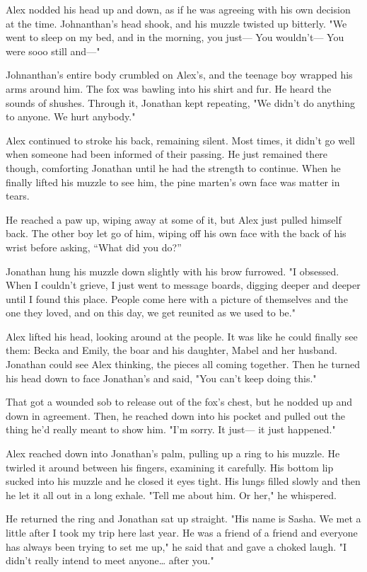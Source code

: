 Alex nodded his head up and down, as if he was agreeing with his own
decision at the time. Johnanthan's head shook, and his muzzle twisted up
bitterly. "We went to sleep on my bed, and in the morning, you just---
You wouldn't--- You were sooo still and---"

Johnanthan's entire body crumbled on Alex's, and the teenage boy wrapped
his arms around him. The fox was bawling into his shirt and fur. He
heard the sounds of shushes. Through it, Jonathan kept repeating, "We
didn't do anything to anyone. We hurt anybody."

Alex continued to stroke his back, remaining silent. Most times, it
didn't go well when someone had been informed of their passing. He just
remained there though, comforting Jonathan until he had the strength to
continue. When he finally lifted his muzzle to see him, the pine
marten's own face was matter in tears.

He reached a paw up, wiping away at some of it, but Alex just pulled
himself back. The other boy let go of him, wiping off his own face with
the back of his wrist before asking, ``What did you do?''

Jonathan hung his muzzle down slightly with his brow furrowed. "I
obsessed. When I couldn't grieve, I just went to message boards, digging
deeper and deeper until I found this place. People come here with a
picture of themselves and the one they loved, and on this day, we get
reunited as we used to be."

Alex lifted his head, looking around at the people. It was like he could
finally see them: Becka and Emily, the boar and his daughter, Mabel and
her husband. Jonathan could see Alex thinking, the pieces all coming
together. Then he turned his head down to face Jonathan's and said, "You
can't keep doing this."

That got a wounded sob to release out of the fox's chest, but he nodded
up and down in agreement. Then, he reached down into his pocket and
pulled out the thing he'd really meant to show him. "I'm sorry. It
just--- it just happened."

Alex reached down into Jonathan's palm, pulling up a ring to his muzzle.
He twirled it around between his fingers, examining it carefully. His
bottom lip sucked into his muzzle and he closed it eyes tight. His lungs
filled slowly and then he let it all out in a long exhale. "Tell me
about him. Or her," he whispered.

He returned the ring and Jonathan sat up straight. "His name is Sasha.
We met a little after I took my trip here last year. He was a friend of
a friend and everyone has always been trying to set me up," he said that
and gave a choked laugh. "I didn't really intend to meet anyone\ldots{}
after you."

